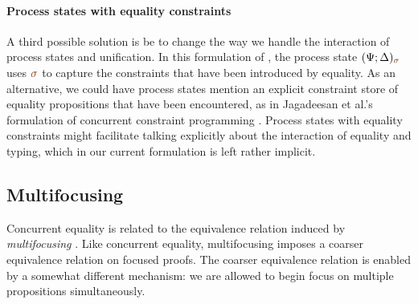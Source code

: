 \paragraph{Process states with equality constraints}
A third possible solution is be to change the way we handle the
interaction of process states and unification. In this formulation of
\sls, the process state $(\Psi; \Delta)_{\lf\sigma}$ uses $\lf\sigma$
to capture the constraints that have been introduced by equality. As
an alternative, we could have process states mention an explicit
constraint store of equality propositions that have been encountered,
as in Jagadeesan et al.'s formulation of concurrent constraint
programming \cite{jagadeesan05testing}. Process states with equality
constraints might facilitate talking explicitly
about the interaction of equality
and typing, which in our current formulation is left rather implicit. 

\subsection{Multifocusing}

Concurrent equality is related to the equivalence relation induced by
{\it multifocusing} \cite{chaudhuri08canonical}. Like concurrent
equality, multifocusing imposes a coarser equivalence relation on
focused proofs. The coarser equivalence relation is enabled by a
somewhat different mechanism: we are allowed to begin focus on
multiple propositions simultaneously.



